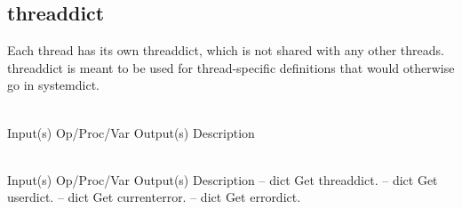 \subsection{threaddict}
\label{sec:threaddict}

Each thread has its own threaddict, which is not shared with any other threads.
threaddict is meant to be used for thread-specific definitions that would
otherwise go in systemdict.

\begin{longtable}{}
\caption{threaddict summary}
\\
\hline
\optableent
	{Input(s)}
	{Op/Proc/Var}
	{Output(s)}
	{Description}
\hline \hline
\endfirsthead
\caption[]{\emph{continued}} \\
\hline
\optableent
	{Input(s)}
	{Op/Proc/Var}
	{Output(s)}
	{Description}
\hline \hline \endhead
{} \endfoot
\hline \endlastfoot
\optableent
	{--}
	{{\bf {}}}
	{dict}
	{Get threaddict.}
\hline
\optableent
	{--}
	{{\bf {}}}
	{dict}
	{Get userdict.}
\hline
\optableent
	{--}
	{{\bf {}}}
	{dict}
	{Get currenterror.}
\hline
\optableent
	{--}
	{{\bf {}}}
	{dict}
	{Get errordict.}
\end{longtable}

